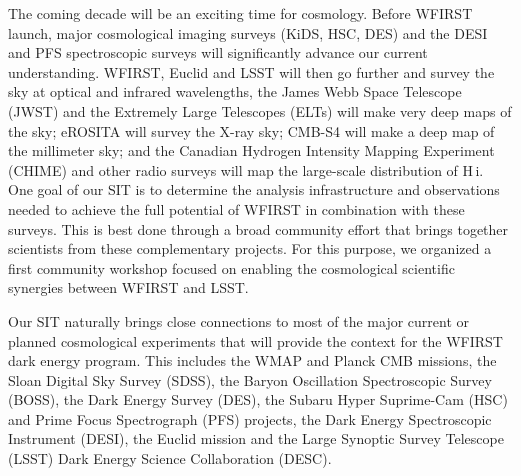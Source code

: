 %
%

\begin{summary}
The coming decade will be an exciting time for cosmology. Before WFIRST launch,
major cosmological imaging surveys (KiDS, HSC, DES) and the DESI and PFS
spectroscopic surveys will significantly advance our current understanding.
WFIRST, Euclid and LSST  will then go further and survey the sky at optical and
infrared wavelengths, the  James Webb Space Telescope (JWST) and the Extremely
Large Telescopes (ELTs) will make very deep maps of the sky; eROSITA will survey
the X-ray sky; CMB-S4 will make a deep map of the millimeter sky; and the
Canadian Hydrogen Intensity Mapping Experiment (CHIME) and other radio surveys
will map the large-scale distribution of H$\,${\sc i}. One goal of our SIT is to
determine the analysis infrastructure and observations needed to achieve the
full potential of WFIRST in combination with these  surveys. This is best done
through a broad community effort that brings together scientists from these
complementary projects. For this purpose, we organized a first community
workshop focused on enabling the cosmological scientific synergies between
WFIRST and LSST.
\end{summary}

Our SIT naturally brings close connections to most of the
major current or planned cosmological experiments that will provide
the context for the WFIRST dark energy program. This includes the WMAP and Planck CMB missions,
the Sloan Digital Sky Survey (SDSS), the Baryon Oscillation Spectroscopic Survey (BOSS), the Dark Energy Survey (DES),
the Subaru Hyper Suprime-Cam (HSC) and Prime Focus Spectrograph (PFS)
projects, the Dark Energy Spectroscopic Instrument (DESI), the
Euclid mission and the Large Synoptic Survey Telescope (LSST) Dark
Energy Science Collaboration (DESC).



